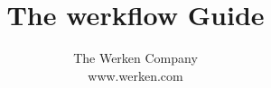 \documentclass[10pt,letterpaper]{book}
\begin{document}
\let\footnoterule\hrule

\makeatletter
\renewcommand{\@makefntext}[1]%
        {\noindent\makebox[1.8em][r]{\@makefnmark}#1}
\makeatother

\title{The \textsf{werkflow} Guide}

\author{\textsf{The Werken Company}\\
        \textsf{www.werken.com}}


\frontmatter

\maketitle


\mainmatter
\end{document}

